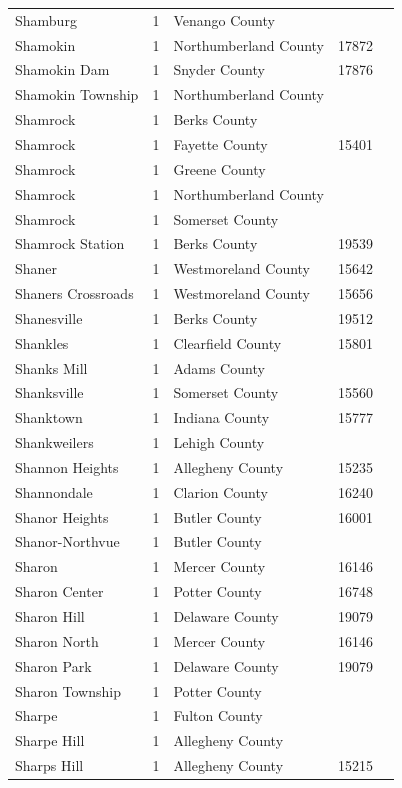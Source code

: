 \documentclass{article}
\begin{document}
\begin{tabular}{lllll}
Shamburg & 1 & Venango County &  &  \\
Shamokin & 1 & Northumberland County & 17872 &  \\
Shamokin Dam & 1 & Snyder County & 17876 &  \\
Shamokin Township & 1 & Northumberland County &  &  \\
Shamrock & 1 & Berks County &  &  \\
Shamrock & 1 & Fayette County & 15401 &  \\
Shamrock & 1 & Greene County &  &  \\
Shamrock & 1 & Northumberland County &  &  \\
Shamrock & 1 & Somerset County &  &  \\
Shamrock Station & 1 & Berks County & 19539 &  \\
Shaner & 1 & Westmoreland County & 15642 &  \\
Shaners Crossroads & 1 & Westmoreland County & 15656 &  \\
Shanesville & 1 & Berks County & 19512 &  \\
Shankles & 1 & Clearfield County & 15801 &  \\
Shanks Mill & 1 & Adams County &  &  \\
Shanksville & 1 & Somerset County & 15560 &  \\
Shanktown & 1 & Indiana County & 15777 &  \\
Shankweilers & 1 & Lehigh County &  &  \\
Shannon Heights & 1 & Allegheny County & 15235 &  \\
Shannondale & 1 & Clarion County & 16240 &  \\
Shanor Heights & 1 & Butler County & 16001 &  \\
Shanor-Northvue & 1 & Butler County &  &  \\
Sharon & 1 & Mercer County & 16146 &  \\
Sharon Center & 1 & Potter County & 16748 &  \\
Sharon Hill & 1 & Delaware County & 19079 &  \\
Sharon North & 1 & Mercer County & 16146 &  \\
Sharon Park & 1 & Delaware County & 19079 &  \\
Sharon Township & 1 & Potter County &  &  \\
Sharpe & 1 & Fulton County &  &  \\
Sharpe Hill & 1 & Allegheny County &  &  \\
Sharps Hill & 1 & Allegheny County & 15215 &  \\

\end{tabular}
\end{document}
